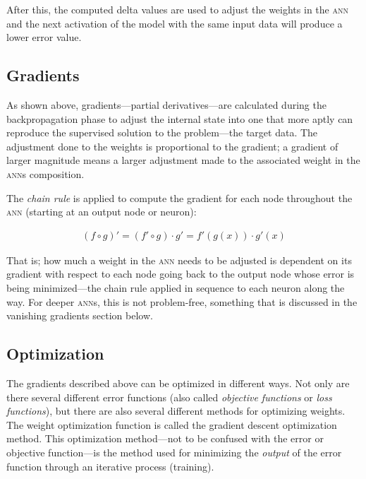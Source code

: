 \begin{multicols}{2}
\noindent After this, the computed delta values are used to adjust the
weights in the \textsc{ann} and the next activation of the model with the same
input data will produce a lower error value.

\subsection{Gradients}

As shown above, gradients---partial derivatives---are calculated during the
backpropagation phase to adjust the internal state into one that more aptly can
reproduce the supervised solution to the problem---the target data.  The
adjustment done to the weights is proportional to the gradient; a gradient of
larger magnitude means a larger adjustment made to the associated weight in the
\textsc{ann}s composition.

The \textit{chain rule} is applied to compute the gradient for each node
throughout the \textsc{ann} (starting at an output node or neuron):

\begin{Figure}
  \begin{align*}
    (f \circ g)' = (f' \circ g) \cdot g' = f'(g(x)) \cdot g'(x)
  \end{align*}
\end{Figure}

\noindent That is; how much a weight in the \textsc{ann} needs to be adjusted is
dependent on its gradient with respect to each node going back to the output
node whose error is being minimized---the chain rule applied in sequence to each
neuron along the way.  For deeper \textsc{ann}s, this is not problem-free,
something that is discussed in the vanishing gradients section
below.

\subsection{Optimization}

The gradients described above can be optimized in different ways.  Not only are
there several different error functions (also called \textit{objective
  functions} or \textit{loss functions}), but there are also several different
methods for optimizing weights. The weight optimization function is called the
gradient descent optimization method.  This optimization method---not to be
confused with the error or objective function---is the method used for
minimizing the \textit{output} of the error function through an iterative
process (training).


\end{multicols}
